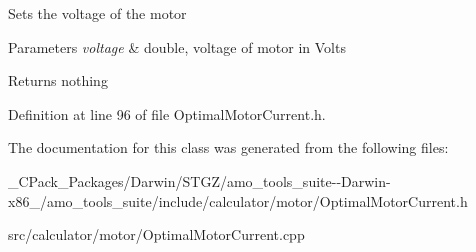 Sets the voltage of the motor


\begin{DoxyParams}{Parameters}
{\em voltage} & double, voltage of motor in Volts\\
\hline
\end{DoxyParams}
\begin{DoxyReturn}{Returns}
nothing 
\end{DoxyReturn}


Definition at line 96 of file Optimal\+Motor\+Current.\+h.



The documentation for this class was generated from the following files\+:\begin{DoxyCompactItemize}
\item 
\+\_\+\+C\+Pack\+\_\+\+Packages/\+Darwin/\+S\+T\+G\+Z/amo\+\_\+tools\+\_\+suite-\/-\/\+Darwin-\/x86\+\_/amo\+\_\+tools\+\_\+suite/include/calculator/motor/Optimal\+Motor\+Current.\+h\item 
src/calculator/motor/Optimal\+Motor\+Current.\+cpp\end{DoxyCompactItemize}
